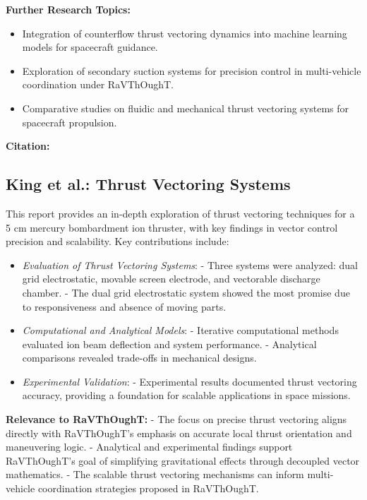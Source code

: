 \textbf{Further Research Topics:}
\begin{itemize}
  \item Integration of counterflow thrust vectoring dynamics into machine learning models for spacecraft guidance.
  \item Exploration of secondary suction systems for precision control in multi-vehicle coordination under RaVThOughT.
  \item Comparative studies on fluidic and mechanical thrust vectoring systems for spacecraft propulsion.
\end{itemize}

\textbf{Citation:} 

\subsection{King et al.: Thrust Vectoring Systems}

This report provides an in-depth exploration of thrust vectoring techniques for a 5 cm mercury bombardment ion thruster, with key findings in vector control precision and scalability. Key contributions include:

\begin{itemize}
  \item \textit{Evaluation of Thrust Vectoring Systems}:
  - Three systems were analyzed: dual grid electrostatic, movable screen electrode, and vectorable discharge chamber.
  - The dual grid electrostatic system showed the most promise due to responsiveness and absence of moving parts.

  \item \textit{Computational and Analytical Models}:
  - Iterative computational methods evaluated ion beam deflection and system performance.
  - Analytical comparisons revealed trade-offs in mechanical designs.

  \item \textit{Experimental Validation}:
  - Experimental results documented thrust vectoring accuracy, providing a foundation for scalable applications in space missions.
\end{itemize}

\textbf{Relevance to RaVThOughT:}
- The focus on precise thrust vectoring aligns directly with RaVThOughT’s emphasis on accurate local thrust orientation and maneuvering logic.
- Analytical and experimental findings support RaVThOughT’s goal of simplifying gravitational effects through decoupled vector mathematics.
- The scalable thrust vectoring mechanisms can inform multi-vehicle coordination strategies proposed in RaVThOughT.

